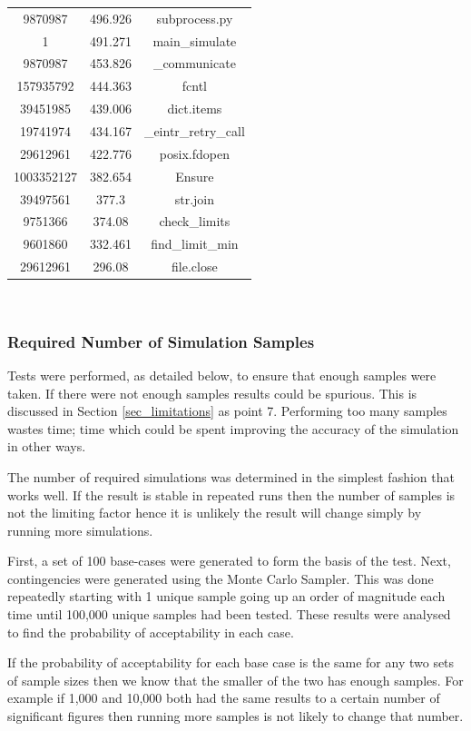 \documentclass[a4paper,oneside,12pt]{report}
\begin{document}
\begin{table}[htbp]
\begin{tabular}{c||c||c}
9870987  &  496.926  &  subprocess.py  \\ 
1  &  491.271  &  main\_simulate  \\ 
9870987  &  453.826  &  \_communicate  \\ 
157935792  &  444.363  &  fcntl  \\ 
39451985  &  439.006  &  dict.items  \\ 
19741974  &  434.167  &  \_eintr\_retry\_call  \\ 
29612961  &  422.776  &  posix.fdopen  \\ 
1003352127  &  382.654  &  Ensure  \\ 
39497561  &  377.3  &  str.join  \\ 
9751366  &  374.08  &  check\_limits  \\ 
9601860  &  332.461  &  find\_limit\_min  \\ 
29612961  &  296.08  &  file.close  \\ 
\hline
\end{tabular}\\
\end{table}

\subsubsection{Required Number of Simulation Samples}

Tests were performed, as detailed below, to ensure that enough samples were taken. If there were not enough samples results could be spurious. This is discussed in Section \ref{sec_limitations} as point 7. Performing too many samples wastes time; time which could be spent improving the accuracy of the simulation in other ways.

The number of required simulations was determined in the simplest fashion that
works well. If the result is stable in repeated runs then the number of
samples is not the limiting factor hence it is unlikely
the result will change simply by running more
simulations.

First, a set of 100 base-cases were generated to form the basis of the
test. Next, contingencies were generated using the Monte Carlo Sampler.
This was done repeatedly starting with 1 unique sample going up an
order of magnitude each time until 100,000 unique samples had been tested. These
results were analysed to find the probability of acceptability in each
case.

If the probability of acceptability for each base case is the same for
any two sets of sample sizes then we know that the smaller of the two
has enough samples. For example if 1,000 and 10,000 both had the same
results to a certain number of significant figures then running more
samples is not likely to change that number.
\end{document}
